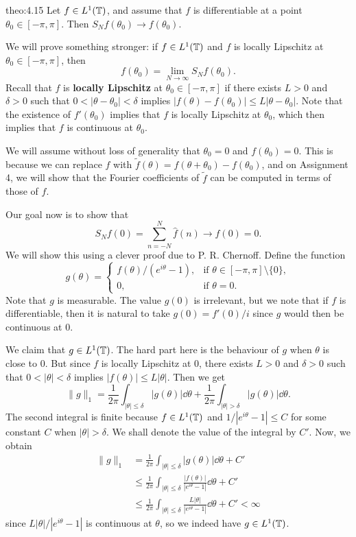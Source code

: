 \begin{theo}{theo:4.15}
    Let $f \in L^1(\mathbb{T})$, and assume that $f$ is differentiable at a point 
    $\theta_0 \in [-\pi, \pi]$. Then $S_N f(\theta_0) \to f(\theta_0)$. 
\end{theo}
\begin{pf}
    We will prove something stronger: if $f \in L^1(\mathbb{T})$ and 
    $f$ is locally Lipschitz at $\theta_0 \in [-\pi, \pi]$, then 
    \[ f(\theta_0) = \lim_{N\to\infty} S_N f(\theta_0). \] 
    Recall that $f$ is {\bf locally Lipschitz} at $\theta_0 \in [-\pi, \pi]$ 
    if there exists $L > 0$ and $\delta > 0$ such that $0 < 
    |\theta - \theta_0| < \delta$ implies $|f(\theta) - f(\theta_0)| 
    \leq L|\theta - \theta_0|$. Note that the existence of $f'(\theta_0)$ 
    implies that $f$ is locally Lipschitz at $\theta_0$, which then 
    implies that $f$ is continuous at $\theta_0$. 

    We will assume without loss of generality that $\theta_0 = 0$ 
    and $f(\theta_0) = 0$. This is because we can replace $f$ with 
    $\tilde f(\theta) = f(\theta + \theta_0) - f(\theta_0)$, and on 
    Assignment 4, we will show that the Fourier coefficients of 
    $\tilde f$ can be computed in terms of those of $f$. 

    Our goal now is to show that 
    \[ S_N f(0) = \sum_{n=-N}^N \hat f(n) \to f(0) = 0. \] 
    We will show this using a clever proof due to P. R. Chernoff. 
    Define the function 
    \[ g(\theta) = \begin{cases}
        f(\theta)/(e^{i\theta} - 1), & \text{if } \theta \in [-\pi, \pi] 
        \setminus \{0\}, \\ 
        0, & \text{if } \theta = 0. 
    \end{cases} \] 
    Note that $g$ is measurable. The value $g(0)$ is irrelevant, but 
    we note that if $f$ is differentiable, then it is natural to take 
    $g(0) = f'(0)/i$ since $g$ would then be continuous at $0$. 

    We claim that $g \in L^1(\mathbb{T})$. The hard part here is the behaviour 
    of $g$ when $\theta$ is close to $0$. But since $f$ is locally Lipschitz 
    at $0$, there exists $L > 0$ and $\delta > 0$ such that 
    $0 < |\theta| < \delta$ implies $|f(\theta)| \leq L|\theta|$. 
    Then we get 
    \[ \|g\|_1 = \frac1{2\pi} \int_{|\theta|\leq\delta} |g(\theta)|\dd\theta 
    + \frac1{2\pi} \int_{|\theta|>\delta} |g(\theta)|\dd\theta. \] 
    The second integral is finite because $f \in L^1(\mathbb{T})$ and 
    $1/|e^{i\theta}-1| \leq C$ for some constant $C$ when $|\theta| > \delta$. 
    We shall denote the value of the integral by $C'$. Now, we obtain 
    \begin{align*}
        \|g\|_1 &= \frac1{2\pi} \int_{|\theta|\leq\delta} |g(\theta)|\dd\theta + C' \\ 
        &\leq \frac{1}{2\pi} \int_{|\theta|\leq\delta} \frac{|f(\theta)|}{|e^{i\theta} - 1|}\dd\theta + C' \\ 
        &\leq \frac{1}{2\pi} \int_{|\theta|\leq\delta} \frac{L|\theta|}{|e^{i\theta} - 1|}\dd\theta + C' < \infty 
    \end{align*}
    since $L|\theta|/|e^{i\theta} - 1|$ is continuous at $\theta$, so we indeed 
    have $g \in L^1(\mathbb{T})$. 


\end{pf}
